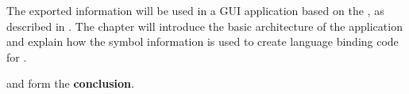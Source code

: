 The exported information will be used in a GUI application based on the , as described in . The chapter will introduce the basic architecture of the application and explain how the symbol information is used to create language binding code for .

 and  form the \textbf{conclusion}.



